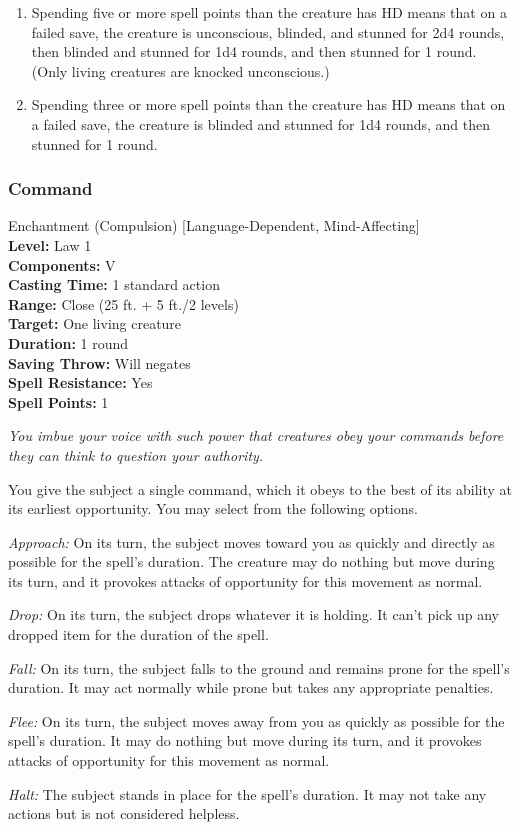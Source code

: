 \begin{enumerate}
\item Spending five or more spell points than the creature has HD means that on a failed save,
the creature is unconscious, blinded, and stunned for 2d4 rounds, then blinded and stunned for 1d4 rounds, and then stunned for 1 round. 
(Only living creatures are knocked unconscious.)
\item Spending three or more spell points than the creature has HD means that on a failed save, 
the creature is blinded and stunned for 1d4 rounds, and then stunned for 1 round. 
\end{enumerate}
\subsubsection{Command}
\label{Spell:Command}
Enchantment (Compulsion) [Language-Dependent, Mind-Affecting]
\\ \textbf{Level:} Law 1
\\ \textbf{Components:} V
\\ \textbf{Casting Time:} 1 standard action
\\ \textbf{Range:} Close (25 ft. + 5 ft./2 levels)
\\ \textbf{Target:} One living creature
\\ \textbf{Duration:} 1 round
\\ \textbf{Saving Throw:} Will negates
\\ \textbf{Spell Resistance:} Yes
\\ \textbf{Spell Points:} 1

\emph{You imbue your voice with such power that creatures obey your commands before they can think to question your authority.}

You give the subject a single command, which it obeys to the best of its ability at its earliest opportunity. You may select from the following options.

\begin{list}{}{\leftmargin=1em}
 \item \emph{Approach:}
On its turn, the subject moves toward you as quickly and directly as possible for the spell's duration. 
The creature may do nothing but move during its turn, and it provokes attacks of opportunity for this movement as normal.
 \item \emph{Drop:}
On its turn, the subject drops whatever it is holding. 
It can't pick up any dropped item for the duration of the spell.
 \item \emph{Fall:}
On its turn, the subject falls to the ground and remains prone for the spell's duration. 
It may act normally while prone but takes any appropriate penalties.
 \item \emph{Flee:}
On its turn, the subject moves away from you as quickly as possible for the spell's duration. 
It may do nothing but move during its turn, and it provokes attacks of opportunity for this movement as normal.
 \item \emph{Halt:}
The subject stands in place for the spell's duration. 
It may not take any actions but is not considered helpless.
\end{list}
